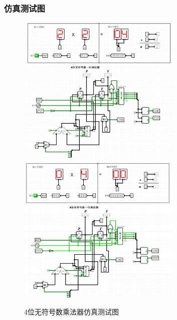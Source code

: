 \documentclass{article}
\begin{document}
    \subsubsection{仿真测试图}
    \begin{figure}[H]
    \centering
    \includegraphics[width=0.7\textwidth]{4.5.1.png}
    \includegraphics[width=0.7\textwidth]{4.5.2.png}
    \caption{4位无符号数乘法器仿真测试图}
    \end{figure}
\end{document}
